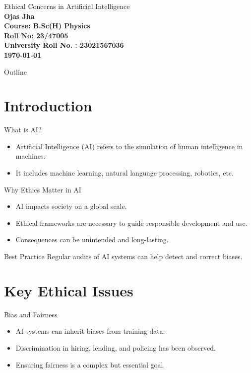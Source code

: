 \documentclass{beamer}
\begin{document}
\begin{frame}
  \centering
  \Huge Ethical Concerns in Artificial Intelligence \\
  \vspace{1cm}
  \tiny \textbf {Ojas Jha \\
  \vspace{0.1cm}
  Course: B.Sc(H) Physics \\
  \vspace{0.1cm}
  Roll No: 23/47005 \\
  \vspace{0.1cm}
  University Roll No. : 23021567036 \\
  \vspace{0.1cm}
  \today}
\end{frame}

\begin{frame}{Outline}
  \tableofcontents
\end{frame}

\section{Introduction}
\begin{frame}{What is AI?}
  \begin{itemize}
    \item Artificial Intelligence (AI) refers to the simulation of human intelligence in machines.
    \item It includes machine learning, natural language processing, robotics, etc.
  \end{itemize}
\end{frame}

\begin{frame}{Why Ethics Matter in AI}
  \begin{itemize}
    \item AI impacts society on a global scale.
    \item Ethical frameworks are necessary to guide responsible development and use.
    \item Consequences can be unintended and long-lasting.
  \end{itemize}
  \begin{exampleblock}{Best Practice}
  Regular audits of AI systems can help detect and correct biases.
\end{exampleblock}
\end{frame}

\section{Key Ethical Issues}
\begin{frame}{Bias and Fairness}
  \begin{itemize}
    \item AI systems can inherit biases from training data.
    \item Discrimination in hiring, lending, and policing has been observed.
    \item Ensuring fairness is a complex but essential goal.
  \end{itemize}
\end{frame}
\end{document}
